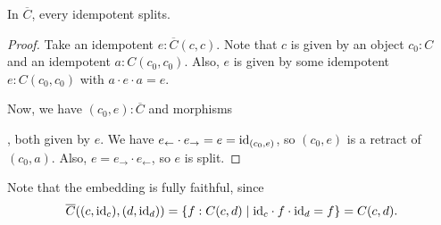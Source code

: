 \begin{lemma}
  In $ \overline C $, every idempotent splits.
\end{lemma}
\begin{proof}
  Take an idempotent $ e: \overline C(c, c) $. Note that $ c $ is given by an object $ c_0: C $ and an idempotent $ a: C(c_0, c_0) $. Also, $ e $ is given by some idempotent $ e: C(c_0, c_0) $ with $ a \cdot e \cdot a = e $.

  Now, we have $ (c_0, e): \overline C $ and morphisms
  , both given by $ e $. We have $ e_\leftarrow \cdot e_\rightarrow = e = \text{id}_{(c_0, e)} $, so $ (c_0, e) $ is a retract of $ (c_0, a) $. Also, $ e = e_\rightarrow \cdot e_\leftarrow $, so $ e $ is split.
\end{proof}

\begin{remark}
  Note that the embedding is fully faithful, since
  \[ \overline C((c, \text{id}_{c}), (d, \text{id}_{d})) = \{ f: C(c, d) \mid \text{id}_{c} \cdot f \cdot \text{id}_{d} = f \} = C(c, d). \]
\end{remark}

